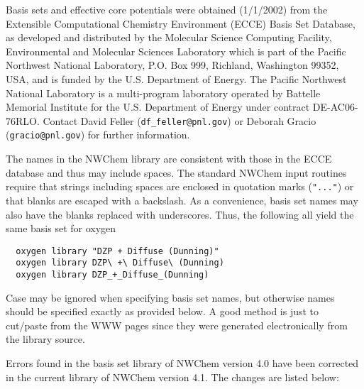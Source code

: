 \label{sec:knownbasis}

Basis sets and effective core potentials were obtained (1/1/2002) from
the Extensible Computational Chemistry Environment (ECCE) Basis Set
Database, as developed and distributed by the Molecular Science
Computing Facility, Environmental and Molecular Sciences Laboratory
which is part of the Pacific Northwest National Laboratory, P.O. Box
999, Richland, Washington 99352, USA, and is funded by the
U.S. Department of Energy.  The Pacific Northwest National Laboratory
is a multi-program laboratory operated by Battelle Memorial Institute
for the U.S. Department of Energy under contract DE-AC06-76RLO.
Contact David Feller (\verb+df_feller@pnl.gov+) or Deborah Gracio
(\verb+gracio@pnl.gov+) for further information.

The names in the NWChem library are consistent with those in the ECCE
database and thus may include spaces.  The standard NWChem input
routines require that strings including spaces are enclosed in
quotation marks (\verb+"..."+) or that blanks are escaped with a
backslash.  As a convenience, basis set names may also have the blanks
replaced with underscores.  Thus, the following all yield the same
basis set for oxygen
\begin{verbatim}
  oxygen library "DZP + Diffuse (Dunning)"
  oxygen library DZP\ +\ Diffuse\ (Dunning)
  oxygen library DZP_+_Diffuse_(Dunning)
\end{verbatim}

Case may be ignored when specifying basis set names, but otherwise
names should be specified exactly as provided below.  A good method is
just to cut/paste from the WWW pages since they were generated
electronically from the library source.

Errors found in the basis set library of NWChem version 4.0 have been corrected in 
the current library of NWChem version 4.1. The changes are listed below:


